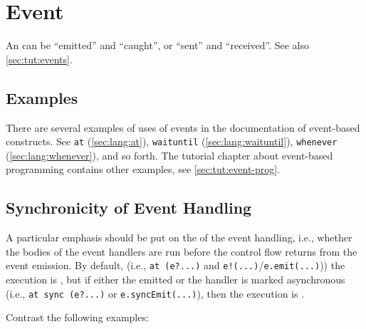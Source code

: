 
\section{Event}

An  can be ``emitted'' and ``caught'', or ``sent'' and
``received''.  See also \autoref{sec:tut:events}.

\subsection{Examples}

There are several examples of uses of events in the documentation of
event-based constructs.  See \lstinline{at} (\autoref{sec:lang:at}),
\lstinline{waituntil} (\autoref{sec:lang:waituntil}), \lstinline{whenever}
(\autoref{sec:lang:whenever}), and so forth.  The tutorial chapter about
event-based programming contains other examples, see
\autoref{sec:tut:event-prog}.

\subsection{Synchronicity of Event Handling}
\label{sec:event:sync}
A particular emphasis should be put on the  of the event
handling, i.e., whether the bodies of the event handlers are run before the
control flow returns from the event emission.  By default, (i.e.,
\lstinline|at (e?...)| and \lstinline|e!(...)|/\lstinline|e.emit(...)|)) the
execution is , but if either the emitted or the handler is
marked asynchronous (i.e., \lstinline|at sync (e?...)| or
\lstinline|e.syncEmit(...)|), then the execution is .

Contrast the following examples:

